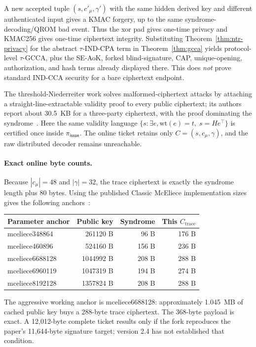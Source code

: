 \documentclass[11pt]{article}
\begin{document}
A new accepted tuple $(s,c'_\mu,\gamma')$ with the same hidden derived key and
different authenticated input gives a KMAC forgery, up to the same
syndrome-decoding/QROM bad event.  Thus the xor pad gives one-time privacy and
KMAC256 gives one-time ciphertext integrity.  Substituting
Theorem~\ref{thm:ntr-privacy} for the abstract $\tau$-IND-CPA term in
Theorem~\ref{thm:gcca} yields protocol-level $\tau$-GCCA, plus the SE-AoK,
forked blind-signature, CAP, unique-opening, authorization, and hash terms already displayed
there.  This does \emph{not} prove standard IND-CCA security for a bare
ciphertext endpoint.

The threshold-Niederreiter work solves malformed-ciphertext attacks by attaching
a straight-line-extractable validity proof to every public ciphertext; its
authors report about 30.5~KB for a three-party ciphertext, with the proof
dominating the syndrome~\cite{threshold-niederreiter,threshold-niederreiter-slides}.
Here the same validity language
$\{s:\exists e,\mathrm{wt}(e)=t,\;s=He^\top\}$
is certified once inside $\pi_{\mathsf{issue}}$.  The online ticket retains only
$C=(s,c_\mu,\gamma)$, and the raw distributed decoder remains unreachable.

\paragraph{Exact online byte counts.}
Because $|c_\mu|=48$ and $|\gamma|=32$, the trace ciphertext is exactly the
syndrome length plus 80 bytes.  Using the published Classic McEliece
implementation sizes gives the following anchors~\cite{classic-mceliece-impl}:
\begin{center}
\begin{tabular}{lrrr}
\toprule
Parameter anchor & Public key & Syndrome & This $C_{\mathrm{trace}}$\\
\midrule
mceliece348864  & 261120 B  &  96 B & 176 B\\
mceliece460896  & 524160 B  & 156 B & 236 B\\
mceliece6688128 & 1044992 B & 208 B & 288 B\\
mceliece6960119 & 1047319 B & 194 B & 274 B\\
mceliece8192128 & 1357824 B & 208 B & 288 B\\
\bottomrule
\end{tabular}
\end{center}
The aggressive working anchor is mceliece6688128: approximately 1.045~MB of
cached public key buys a 288-byte trace ciphertext.  The 368-byte payload is
exact.  A 12,012-byte complete ticket results only if the fork reproduces the
paper's 11,644-byte signature target; version 2.4 has not established that
condition.
\end{document}
